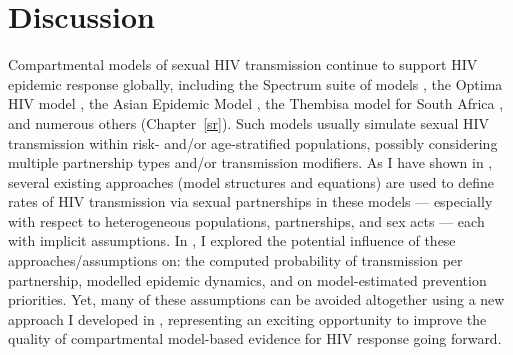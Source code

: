 \section{Discussion}\label{foi.disc}
Compartmental models of sexual HIV transmission continue to support HIV epidemic response globally,
including the Spectrum suite of models \cite{Stover2021,Spectrum2022},
the Optima HIV model \cite{Kerr2015,Optima2021},
the Asian Epidemic Model \cite{Brown2004},
the Thembisa model for South Africa \cite{Johnson2016cc,Johnson2022},
and numerous others (\eg Chapter~\ref{sr}).
Such models usually simulate sexual HIV transmission within risk- and/or age-stratified populations,
possibly considering multiple partnership types and/or transmission modifiers.
As I have shown in ,
several existing approaches (model structures and equations)
are used to define rates of HIV transmission via sexual partnerships in these models
--- especially with respect to heterogeneous populations, partnerships, and sex acts ---
each with implicit assumptions.
In , I explored the potential influence of these approaches/assumptions on:
the computed probability of transmission per partnership,
modelled epidemic dynamics, and on model-estimated prevention priorities.
Yet, many of these assumptions can be avoided altogether
using a new approach I developed in ,
representing an exciting opportunity to improve the quality of
compartmental model-based evidence for HIV response going forward.
